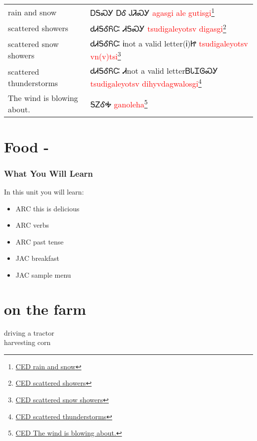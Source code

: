\begin{multicols}
\begin{minipage}{\linewidth}
\begin{tabular}{p{5cm} p{9cm}}
rain and snow & ᎠᎦᏍᎩ ᎠᎴ ᎫᏘᏍᎩ 
 \newline \textcolor{red}{agasgi ale gutisgi}\footnote{\href{https://cherokeedictionary.net/share/101983}{CED rain and snow}}\\
scattered showers & ᏧᏗᎦᎴᏲᏨ ᏗᎦᏍᎩ 
 \newline \textcolor{red}{tsudigaleyotsv digasgi}\footnote{\href{https://cherokeedictionary.net/share/101984}{CED scattered showers}}\\
scattered snow showers & ᏧᏗᎦᎴᏲᏨ Ꭵnot a valid letter(Ꭵ)Ꮵ 
 \newline \textcolor{red}{tsudigaleyotsv vn(v)tsi}\footnote{\href{https://cherokeedictionary.net/share/101985}{CED scattered snow showers}}\\
scattered thunderstorms & ᏧᏗᎦᎴᏲᏨ  Ꮧnot a valid letterᏴᏓᏆᎶᏍᎩ 
 \newline \textcolor{red}{tsudigaleyotsv  dihyvdagwalosgi}\footnote{\href{https://cherokeedictionary.net/share/101986}{CED scattered thunderstorms}}\\
The wind is blowing about. & ᎦᏃᎴᎭ 
 \newline \textcolor{red}{ganoleha}\footnote{\href{https://cherokeedictionary.net/share/101987}{CED The wind is blowing about.}}\\
\end{tabular}
\end{minipage}

\index{}
\chapter{Food - }
\subsection{What You Will Learn}
In this unit you will learn:
\begin{itemize}
\item ARC this is delicious
\item ARC verbs
\item ARC past tense
\item JAC breakfast
\item JAC sample menu
\end{itemize}\newpage

\newpage{}
\chapter{on the farm}
driving a tractor\\
harvesting corn\\

\end{multicols}
